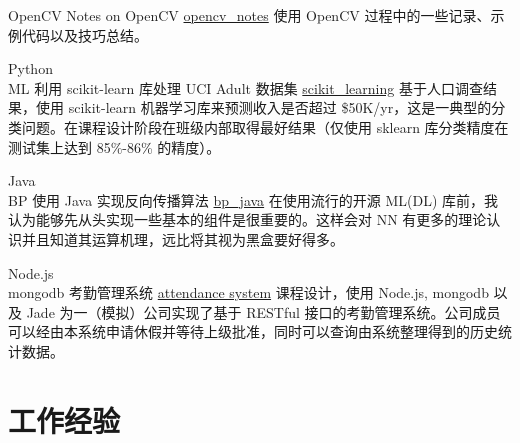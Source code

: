 \documentclass[utf8]{twentysecondcv} %
\begin{document}
\begin{twenty}

    \twentyitem
        {OpenCV}
        {Notes on OpenCV}
        {\href{https://github.com/MiaoDX/opencv\_projects/}{opencv\_notes}}
        {}
        {使用 OpenCV 过程中的一些记录、示例代码以及技巧总结。}

    \twentyitem
        {Python \\ ML}
        {利用 scikit-learn 库处理 UCI Adult 数据集}
        {\href{https://github.com/MiaoDX/scikit\_learning/}{scikit\_learning}}
        {}
		{基于人口调查结果，使用 scikit-learn 机器学习库来预测收入是否超过 \$50K/yr，这是一典型的分类问题。在课程设计阶段在班级内部取得最好结果（仅使用 sklearn 库分类精度在测试集上达到 85\%-86\% 的精度）。}        
     	
	

        
    \twentyitem
        {Java \\ BP}
        {使用 Java 实现反向传播算法}
        {\href{https://github.com/MiaoDX/bp_java}{bp\_java}}
        {}                
        {在使用流行的开源 ML(\/DL) 库前，我认为能够先从头实现一些基本的组件是很重要的。这样会对 NN 有更多的理论认识并且知道其运算机理，远比将其视为黑盒要好得多。}

    \twentyitem
        {Node.js \\ mongodb}
        {考勤管理系统}
        {\href{https://github.com/SEAPC2016/attendance}{attendance system}}
        {}
        {课程设计，使用 Node.js, mongodb 以及 Jade 为一（模拟）公司实现了基于 RESTful 接口的考勤管理系统。公司成员可以经由本系统申请休假并等待上级批准，同时可以查询由系统整理得到的历史统计数据。}

        


\end{twenty}


\section{工作经验}

%
\end{document}
